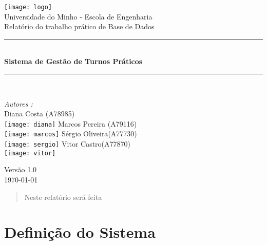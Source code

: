 \documentclass[a4paper]{article}
\begin{document}
\begin{titlepage}
\begin{center}


\texttt{[image: logo]}\\[0.3cm]

{\large Universidade do Minho - Escola de Engenharia}\\[0.5cm]

{\large Relatório do trabalho prático de Base de Dados}\\[0.5cm]



\rule{\linewidth}{0.5mm} \\[0.4cm]
{ \huge \bfseries Sistema de Gestão de Turnos Práticos \\[0.4cm] }
\rule{\linewidth}{0.5mm} \\[1.5cm]

\noindent
\begin{minipage}{0.4\textwidth}
  \begin{flushleft} \large
    \emph{Autores :}\\
    Diana Costa \textsc{(A78985)}\\
    \texttt{[image: diana]}\break
    Marcos Pereira \textsc{(A79116)}\\
    \texttt{[image: marcos]}\break
    Sérgio Oliveira\textsc{(A77730)}\\
    \texttt{[image: sergio]}\break
    Vitor Castro\textsc{(A77870)}\\
    \texttt{[image: vitor]}\break
  \end{flushleft}
\end{minipage}%
\vfill

{\large Versão 1.0 \\ \today}

\end{center}
\end{titlepage}


\begin{abstract}

\hspace{3mm}Neste relatório será feita

\end{abstract}

\pagebreak
\tableofcontents

\pagebreak

\section{Definição do Sistema}
\label{sec:1}
\end{document}
